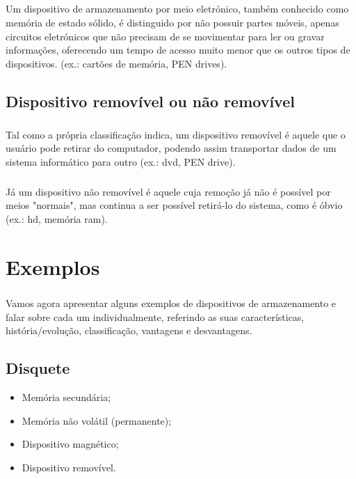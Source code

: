 \documentclass[a4paper]{report}
\begin{document}
\paragraph*{}Um dispositivo de armazenamento por meio eletrónico, também conhecido como memória de estado sólido, é distinguido por não possuir partes móveis, apenas circuitos eletrónicos que não precisam de se movimentar para ler ou gravar informações, oferecendo um tempo de acesso muito menor que os outros tipos de dispositivos. (ex.: cartões de memória, PEN drives).

\section{Dispositivo removível ou não removível}
\label{sect.dispremovnremv}

\paragraph*{}Tal como a própria classificação indica, um dispositivo removível é aquele que o usuário pode retirar do computador, podendo assim transportar dados de um sistema informático para outro (ex.: \ac{dvd}, PEN drive).

\paragraph*{}Já um dispositivo não removível é aquele cuja remoção já não é possível por meios "normais", mas continua a ser possível retirá-lo do sistema, como é óbvio (ex.: \ac{hd}, memória \ac{ram}).

\chapter{Exemplos}
\label{chap.exemplos}
\paragraph*{}Vamos agora apresentar alguns exemplos de dispositivos de armazenamento e falar sobre cada um individualmente, referindo as suas características, história/evolução, classificação, vantagens e desvantagens.

\newpage

\section{Disquete}
\label{sect.disquete}

\begin{itemize}
\item Memória secundária;
\item Memória não volátil (permanente);
\item Dispositivo magnético;
\item Dispositivo removível.
\end{itemize}
\end{document}
